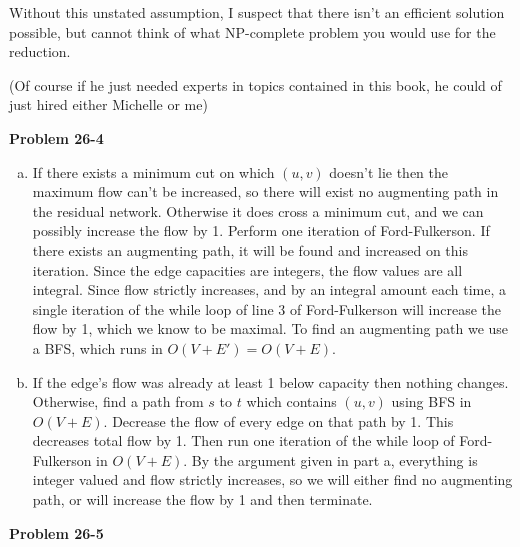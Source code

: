 \documentclass{article}
\begin{document}
\begin{enumerate}[a.]
Without this unstated assumption, I suspect that there isn't an efficient solution possible, but cannot think of what NP-complete problem you would use for the reduction.



(Of course if he just needed experts in topics contained in this book, he could of just hired either Michelle or me)
\end{enumerate}

\noindent\textbf{Problem 26-4}\\

\begin{enumerate}[a.]
\item If there exists a minimum cut on which $(u,v)$ doesn't lie then the maximum flow can't be increased, so there will exist no augmenting path in the residual network.  Otherwise it does cross a minimum cut, and we can possibly increase the flow by 1.   Perform one iteration of Ford-Fulkerson.  If there exists an augmenting path, it will be found and increased on this iteration.  Since the edge capacities are integers, the flow values are all integral.  Since flow strictly increases, and by an integral amount each time, a single iteration of the while loop of line 3 of Ford-Fulkerson will increase the flow by 1, which we know to be maximal.  To find an augmenting path we use a BFS, which runs in $O(V+E') = O(V+E)$. 

\item If the edge's flow was already at least 1 below capacity then nothing changes.  Otherwise, find a path from $s$ to $t$ which contains $(u,v)$ using BFS in $O(V+E)$.  Decrease the flow of every edge on that path by 1.  This decreases total flow by 1.  Then run one iteration of the while loop of Ford-Fulkerson in $O(V+E)$.  By the argument given in part a, everything is integer valued and flow strictly increases, so we will either find no augmenting path, or will increase the flow by 1 and then terminate. 
\end{enumerate} 

\noindent\textbf{Problem 26-5}\\
\end{document}
